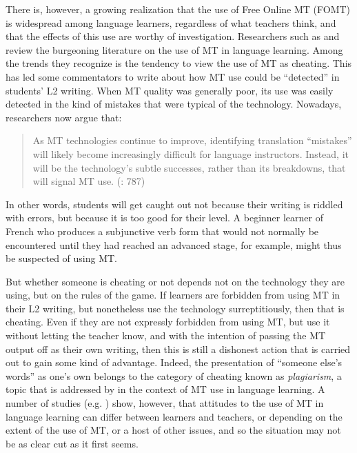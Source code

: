 \documentclass[output=paper,colorlinks,citecolor=brown,
]{langscibook}
\begin{document}
\begin{sloppypar}
There is, however, a growing realization that the use of Free Online MT (FOMT) is widespread among language learners, regardless of what teachers think, and that the effects of this use are worthy of investigation. Researchers such as \citet{Lee2021} and \citet{JolleyMaimone2022} review the burgeoning literature on the use of MT in language learning. Among the trends they recognize is the tendency to view the use of MT as cheating. This has led some commentators to write about how MT use could be “detected” in students’ L2 writing. When MT quality was generally poor, its use was easily detected in the kind of mistakes that were typical of the technology. Nowadays, researchers now argue that:\end{sloppypar}

\begin{quote}
As MT technologies continue to improve, identifying translation “mistakes” will likely become increasingly difficult for language instructors. Instead, it will be the technology's subtle successes, rather than its breakdowns, that will signal MT use. (\citealt{DucarSchocket2018}: 787)
\end{quote}

In other words, students will get caught out not because their writing is riddled with errors, but because it is too good for their level. A beginner learner of French who produces a subjunctive verb form that would not normally be encountered until they had reached an advanced stage, for example, might thus be suspected of using MT.

But whether someone is cheating or not depends not on the technology they are using, but on the rules of the game. If learners are forbidden from using MT in their L2 writing, but nonetheless use the technology surreptitiously, then that is cheating. Even if they are not expressly forbidden from using MT, but use it without letting the teacher know, and with the intention of passing the MT output off as their own writing, then this is still a dishonest action that is carried out to gain some kind of advantage. Indeed, the presentation of “someone else’s words” as one’s own belongs to the category of cheating known as \textit{plagiarism}, a topic that is addressed by \citet{MundtGroves2016} in the context of MT use in language learning. A number of studies (e.g. \citealt{Correa2011, Clifford2013, DucarSchocket2018}) show, however, that attitudes to the use of MT in language learning can differ between learners and teachers, or depending on the extent of the use of MT, or a host of other issues, and so the situation may not be as clear cut as it first seems. 
\end{document}
